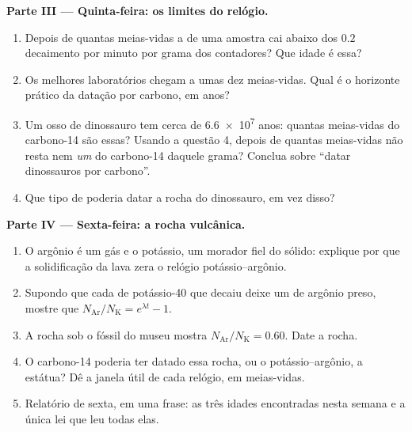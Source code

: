 \begin{problem}
\medskip
\noindent\textbf{Parte III --- Quinta-feira: os limites do relógio.}
\begin{enumerate}[resume]
  \item Depois de quantas meias-vidas a  de uma amostra cai abaixo dos $0.2$
        decaimento por minuto por grama dos contadores? Que idade é essa?
  \item Os melhores laboratórios chegam a umas dez meias-vidas. Qual é o horizonte
        prático da datação por carbono, em anos?
  \item Um osso de dinossauro tem cerca de \num{6.6e7} anos: quantas meias-vidas do
        carbono-14 são essas? Usando a questão 4, depois de quantas meias-vidas não
        resta nem \emph{um}  do carbono-14 daquele grama? Conclua sobre ``datar
        dinossauros por carbono''.
  \item Que tipo de  poderia datar a rocha do dinossauro, em vez disso?
\end{enumerate}

\medskip
\noindent\textbf{Parte IV --- Sexta-feira: a rocha vulcânica.}
\begin{enumerate}[resume]
  \item O argônio é um gás e o potássio, um morador fiel do sólido: explique por que a
        solidificação da lava zera o relógio potássio--argônio.
  \item Supondo que cada  de potássio-40 que decaiu deixe um  de argônio
        preso, mostre que $N_{\mathrm{Ar}}/N_{\mathrm K} = e^{\lambda t} - 1$.
  \item A rocha sob o fóssil do museu mostra $N_{\mathrm{Ar}}/N_{\mathrm K} = 0.60$.
        Date a rocha.
  \item O carbono-14 poderia ter datado essa rocha, ou o potássio--argônio, a estátua?
        Dê a janela útil de cada relógio, em meias-vidas.
  \item Relatório de sexta, em uma frase: as três idades encontradas nesta semana e a
        única lei que leu todas elas.
\end{enumerate}
\end{problem}

